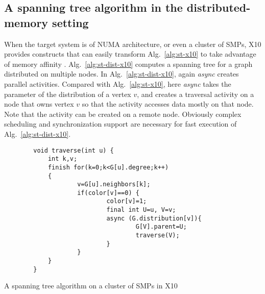 \subsection{A spanning tree algorithm in the distributed-memory setting}
\label{s:trav-dist}

 When the target system is of NUMA architecture, or even a cluster of SMPs, X10 provides constructs that can easily transform Alg.~\ref{alg:st-x10} to take advantage of memory affinity . Alg.~\ref{alg:st-dist-x10} computes a spanning tree for a graph distributed on multiple nodes. In Alg.~\ref{alg:st-dist-x10}, again \emph{async} creates parallel activities. Compared with Alg.~\ref{alg:st-x10}, here \emph{async} takes the parameter of the distribution of a vertex $v$, and creates a traversal activity on a node that owns vertex $v$ so that the activity accesses data mostly on that node. Note that the activity can be created on a remote node. Obviously complex scheduling and synchronization support are necessary for fast execution of Alg.~\ref{alg:st-dist-x10}.
 
\begin{algorithm}
\begin{verbatim} 
        void traverse(int u) {
            int k,v;
            finish for(k=0;k<G[u].degree;k++)
            {
                    v=G[u].neighbors[k];
                    if(color[v]==0) {
                            color[v]=1;
                            final int U=u, V=v;
                            async (G.distribution[v]){
                                    G[V].parent=U;
                                    traverse(V);
                            }
                    }
            }
        }
\end{verbatim}
\caption{A spanning tree algorithm on a cluster of SMPs in X10}
\label{alg:st-dist-x10}
\end{algorithm}


